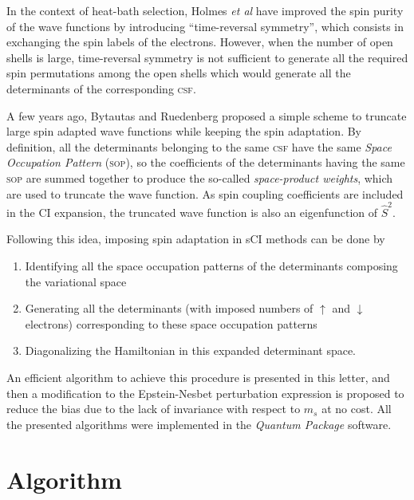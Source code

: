 \documentclass[aip,jcp,reprint,showkeys]{revtex4-1}
\newcommand{\stwo}{\hat{S}^2}
\newcommand{\up}{\uparrow}
\newcommand{\dn}{\downarrow}
\newcommand{\sop}{\textsc{sop}}
\newcommand{\csf}{\textsc{csf}}
\begin{document}
In the context of heat-bath selection, Holmes \textit{et al} have 
improved the spin purity of the wave functions by introducing ``time-reversal
symmetry''\cite{Holmes_2017}, which consists in exchanging the spin labels of
the electrons.
However, when the number of open shells is large, time-reversal symmetry is not
sufficient to generate all the required spin permutations among the open shells
which would generate all the determinants of the corresponding \csf.

A few years ago, Bytautas and Ruedenberg proposed a simple scheme to truncate
large spin adapted wave functions while keeping the spin
adaptation.\cite{Bytautas_2007}
By definition, all the determinants belonging to the same {\csf} have the same
\emph{Space Occupation Pattern} (\sop), so the
coefficients of the determinants having the same {\sop}
are summed together to produce the so-called \emph{space-product
weights}, which are used to truncate the wave function. As spin coupling
coefficients are included in the CI expansion, the truncated wave function is
also an eigenfunction of $\stwo$.

Following this idea, imposing spin adaptation in sCI methods can be done by 
\begin{enumerate}
\item Identifying all the space occupation patterns of the determinants composing
      the variational space
\item Generating all the determinants (with imposed numbers of $\up$ and
      $\dn$ electrons) corresponding to these space occupation patterns
\item Diagonalizing the Hamiltonian in this expanded determinant space.
\end{enumerate}
An efficient algorithm to achieve this procedure is presented in this letter,
and then a modification to the Epstein-Nesbet perturbation expression is
proposed to reduce the bias due to the lack of invariance with respect to 
$m_s$ at no cost.  All the presented algorithms were implemented in the
\emph{Quantum Package} software.\cite{qp}


\section{Algorithm}
\end{document}
